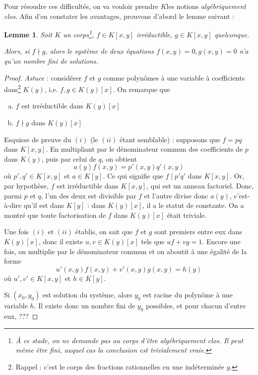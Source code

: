 \documentclass[a4paper, 11pt]{article}
\newtheorem{lemme}[théorème]{Lemme}
\theoremstyle{definition}
\begin{document}
Pour résoudre ces difficultés, on va vouloir prendre $K$les notions
\emph{algébriquement clos}. Afin d'en constater les avantages,
prouvons d'abord le lemme suivant :
\begin{lemme}
  Soit $K$ un corps\footnote{À ce stade, on ne demande pas au corps
    d'être algébriquement clos. Il peut même être fini, auquel cas la
    conclusion est trivialement vraie.}, $f \in K[x,y]$ irréductible,
  $g \in K[x,y]$ quelconque.

  Alors, si $f \nmid g$, alors le système de deux équations
  $f(x,y) = 0, g(x,y) = 0$ n'a qu'un nombre fini de solutions.
\end{lemme}
\begin{proof}
  \emph{Astuce} : considérer $f$ et $g$ comme polynômes à une variable
  à coefficients dans\footnote{Rappel : c'est le corps des fractions
    rationnelles en une indéterminée $y$.} $K(y)$, i.e.
  $f, g \in K(y)[x]$. On remarque que
  \begin{enumerate}[(a)]
  \item $f$ est irréductible dans $K(y)[x]$
  \item $f \nmid g$ dans $K(y)[x]$
  \end{enumerate}
  Esquisse de preuve du $(i)$ (le $(ii)$ étant semblable) : supposons
  que $f = pq$ dans $K[x,y]$. En multipliant par le dénominateur
  commun des coefficients de $p$ dans $K(y)$, puis par celui de
  $q$, on obtient
  \[ a(y)f(x,y) = p'(x,y)q'(x,y) \]
  où $p', q' \in K[x,y]$ et $a \in K[y]$. Ce qui signifie que
  $f \mid p'q'$ dans $K[x,y]$. Or, par hypothèse, $f$ est irréductible
  dans $K[x,y]$, qui est un anneau factoriel. Donc, parmi $p$ et $q$,
  l'un des deux est divisible par $f$ et l'autre divise donc $a(y)$,
  c'est-à-dire qu'il est dans $K[y]$ : dans $K(y)[x]$, il a le statut
  de constante. On a montré que toute factorisation de $f$ dans
  $K(y)[x]$ était triviale.

  Une fois $(i)$ et $(ii)$ établis, on sait que $f$ et $g$ sont
  premiers entre eux dans $K(y)[x]$, donc il existe $u, v \in K(y)[x]$
  tels que $uf+vg=1$. Encore une fois, on multiplie par le
  dénominateur commun et on aboutit à une égalité de la forme
  \[ u'(x,y)f(x,y) + v'(x,y)g(x,y) = h(y) \]
  où $u', v' \in K[x,y]$ et $h \in K[y]$.

  Si $(x_0, y_0)$ est solution du système, alors $y_0$ est racine du
  polynôme à une variable $h$. Il existe donc un nombre fini de $y_0$
  possibles, et pour chacun d'entre eux, ???
\end{proof}
\end{document}
